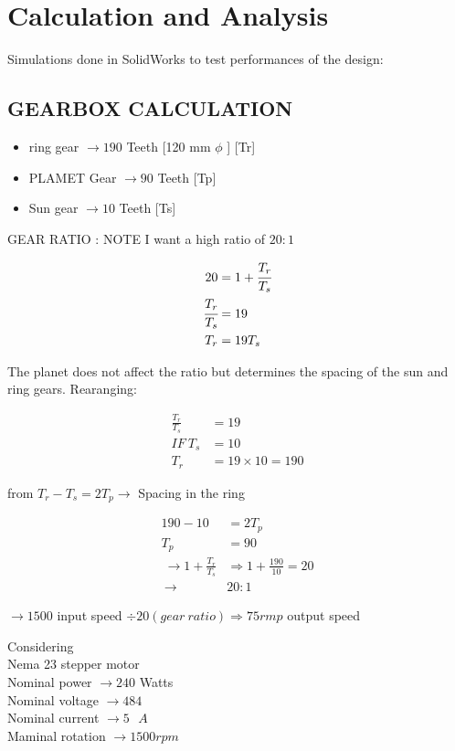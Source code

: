 \documentclass[../../main]{subfiles}
\begin{document}
\section{Calculation and Analysis}

Simulations done in SolidWorks to test performances of the design:


\subsection{GEARBOX CALCULATION}


\begin{itemize}
\item
  ring gear \(\rightarrow 190\) Teeth {[}120 mm \(\phi\) {]} {[}Tr{]}
\item
  PLAMET Gear \(\rightarrow 90\) Teeth {[}Tp{]}
\item
  Sun gear \(\rightarrow 10\) Teeth {[}Ts{]}
\end{itemize}

GEAR RATIO : NOTE I want a high ratio of $20:1$

\[\begin{aligned}
  20 &= 1 + \cfrac{T_{r}}{T_{s}} \\
  \cfrac{T_{r}}{T_{s}} &= 19 \\
  T_{r} &= 19T_{s}
\end{aligned}\]

The planet does not affect the ratio but determines the spacing of the
sun and ring gears.
Rearanging:

\[\begin{aligned}
\frac{T_{r}}{T_{s}} &= 19 \\
IF\ T_{s} &= 10 \\
T_{r} &= 19 \times 10 = 190
\end{aligned}\]

from \(T_{r} - T_{s} = 2T_{p} \rightarrow\) Spacing in the ring

\[\begin{aligned}
190 - 10 &= 2T_{p} \\
T_{p} &= 90 \\
\ \to 1 + \frac{T_{r}}{T_{s}} &\Rightarrow 1 + \frac{190}{10} = 20 \\
\ \to &20:1
\end{aligned}\]

\(\to 1500\) input speed
\(\div 20(gear\ ratio) \Rightarrow 75rmp\) output speed

Considering\\
Nema 23 stepper motor\\
Nominal power \(\rightarrow 240\) Watts\\
Nominal voltage \(\rightarrow 484\)\\
Nominal current \(\rightarrow 5\text{ }A\)\\
Maminal rotation \(\rightarrow 1500rpm\)
\end{document}

